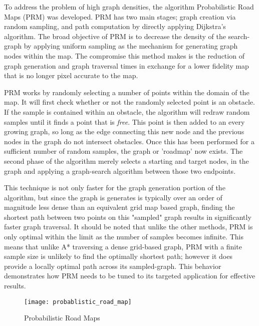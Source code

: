 To address the problem of high graph densities, the algorithm Probabilistic Road Maps (PRM) was developed. PRM has two main stages; graph creation via random sampling, and path computation by directly applying Dijkstra's algorithm. The broad objective of PRM is to decrease the density of the search-graph by applying uniform sampling as the mechanism for generating graph nodes within the map. The compromise this method makes is the reduction of graph generation and graph traversal times in exchange for a lower fidelity map that is no longer pixel accurate to the map.

PRM works by randomly selecting a number of points within the domain of the map. It will first check whether or not the randomly selected point is an obstacle. If the sample is contained within an obstacle, the algorithm will redraw random samples until it finds a point that is \textit{free}. This point is then added to an every growing graph, so long as the edge connecting this new node and the previous nodes in the graph do not intersect obstacles. Once this has been performed for a sufficient number of random samples, the graph or 'roadmap' now exists. The second phase of the algorithm merely selects a starting and target nodes, in the graph and applying a graph-search algorithm between those two endpoints.

This technique is not only faster for the graph generation portion of the algorithm, but since the graph is generates is typically over an order of magnitude less dense than an equivalent grid map based graph, finding the shortest path between two points on this "sampled" graph results in significantly faster graph traversal. It should be noted that unlike the other methods, PRM is only optimal within the limit as the number of samples becomes infinite. This means that unlike A* traversing a dense grid-based graph, PRM with a finite sample size is unlikely to find the optimally shortest path; however it does provide a locally optimal path across its sampled-graph. This behavior demonstrates how PRM needs to be tuned to its targeted application for effective results.  



\begin{figure}[h!]
    \texttt{[image: probablistic\_road\_map]}
    \centering
    \label{fig:PRM}
    \caption{Probabilistic Road Maps}
  \end{figure}

